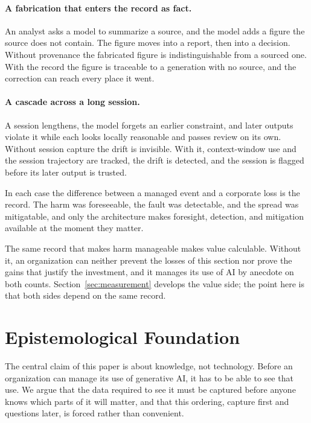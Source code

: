 \documentclass[11pt]{article}
\begin{document}
\paragraph{A fabrication that enters the record as fact.} An analyst asks a model
to summarize a source, and the model adds a figure the source does not contain.
The figure moves into a report, then into a decision. Without provenance the
fabricated figure is indistinguishable from a sourced one. With the record the
figure is traceable to a generation with no source, and the correction can reach
every place it went.

\paragraph{A cascade across a long session.} A session lengthens, the model
forgets an earlier constraint, and later outputs violate it while each looks
locally reasonable and passes review on its own. Without session capture the drift
is invisible. With it, context-window use and the session trajectory are tracked,
the drift is detected, and the session is flagged before its later output is
trusted.

In each case the difference between a managed event and a corporate loss is the
record. The harm was foreseeable, the fault was detectable, and the spread was
mitigatable, and only the architecture makes foresight, detection, and mitigation
available at the moment they matter.

The same record that makes harm manageable makes value calculable. Without it, an
organization can neither prevent the losses of this section nor prove the gains
that justify the investment, and it manages its use of AI by anecdote on both
counts. Section~\ref{sec:measurement} develops the value side; the point here is
that both sides depend on the same record.

\section{Epistemological Foundation}
\label{sec:epistemology}

The central claim of this paper is about knowledge, not technology. Before an
organization can manage its use of generative AI, it has to be able to see that
use. We argue that the data required to see it must be captured before anyone
knows which parts of it will matter, and that this ordering, capture first and
questions later, is forced rather than convenient.
\end{document}
